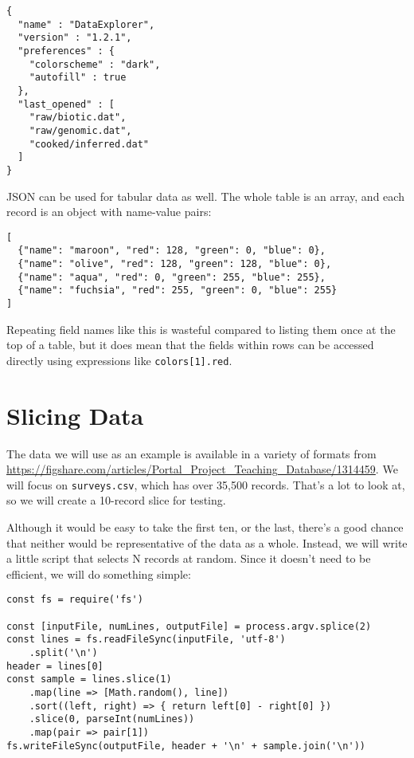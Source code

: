 \begin{verbatim}
{
  "name" : "DataExplorer",
  "version" : "1.2.1",
  "preferences" : {
    "colorscheme" : "dark",
    "autofill" : true
  },
  "last_opened" : [
    "raw/biotic.dat",
    "raw/genomic.dat",
    "cooked/inferred.dat"
  ]
}
\end{verbatim}

JSON can be used for tabular data as well.
The whole table is an array,
and each record is an object with name-value pairs:

\begin{verbatim}
[
  {"name": "maroon", "red": 128, "green": 0, "blue": 0},
  {"name": "olive", "red": 128, "green": 128, "blue": 0},
  {"name": "aqua", "red": 0, "green": 255, "blue": 255},
  {"name": "fuchsia", "red": 255, "green": 0, "blue": 255}
]
\end{verbatim}

Repeating field names like this is wasteful compared to listing them once at the top of a table,
but it does mean that the fields within rows can be accessed directly
using expressions like \texttt{colors{[}1{]}.red}.

\section{Slicing Data}\label{s:dataman-slicing}

The data we will use as an example is available in a variety of formats from \url{https://figshare.com/articles/Portal_Project_Teaching_Database/1314459}.
We will focus on \texttt{surveys.csv},
which has over 35,500 records.
That's a lot to look at,
so we will create a 10-record slice for testing.

Although it would be easy to take the first ten,
or the last,
there's a good chance that neither would be representative of the data as a whole.
Instead,
we will write a little script that selects N records at random.
Since it doesn't need to be efficient,
we will do something simple:

\begin{verbatim}
const fs = require('fs')

const [inputFile, numLines, outputFile] = process.argv.splice(2)
const lines = fs.readFileSync(inputFile, 'utf-8')
    .split('\n')
header = lines[0]
const sample = lines.slice(1)
    .map(line => [Math.random(), line])
    .sort((left, right) => { return left[0] - right[0] })
    .slice(0, parseInt(numLines))
    .map(pair => pair[1])
fs.writeFileSync(outputFile, header + '\n' + sample.join('\n'))
\end{verbatim}

